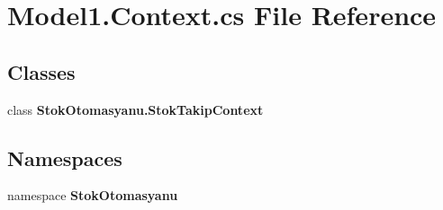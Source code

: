 \section{Model1.\+Context.\+cs File Reference}
\label{_model1_8_context_8cs}
\subsection*{Classes}
\begin{DoxyCompactItemize}
\item 
class \textbf{ Stok\+Otomasyanu.\+Stok\+Takip\+Context}
\end{DoxyCompactItemize}
\subsection*{Namespaces}
\begin{DoxyCompactItemize}
\item 
namespace \textbf{ Stok\+Otomasyanu}
\end{DoxyCompactItemize}
